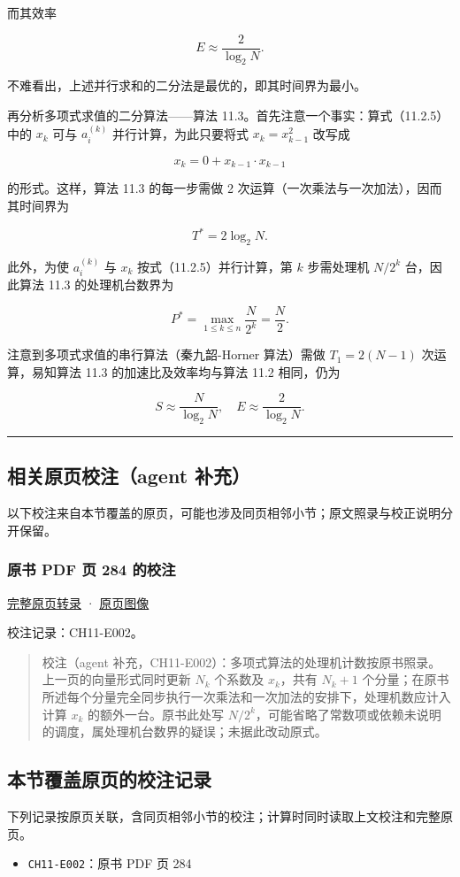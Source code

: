 \documentclass[
  10pt,
  fontset=fandol]{ctexart}
\providecommand{\tightlist}{%
  \setlength{\itemsep}{0pt}\setlength{\parskip}{0pt}}
\begin{document}
而其效率

\[
E\approx\frac{2}{\log_2 N}.
\]

不难看出，上述并行求和的二分法是最优的，即其时间界为最小。

再分析多项式求值的二分算法------算法 11.3。首先注意一个事实：算式（11.2.5）中的 \(x_k\) 可与 \(a_i^{(k)}\) 并行计算，为此只要将式 \(x_k=x_{k-1}^2\) 改写成

\[
x_k=0+x_{k-1}\cdot x_{k-1}
\]

的形式。这样，算法 11.3 的每一步需做 2 次运算（一次乘法与一次加法），因而其时间界为

\[
T^*=2\log_2 N.
\]

此外，为使 \(a_i^{(k)}\) 与 \(x_k\) 按式（11.2.5）并行计算，第 \(k\) 步需处理机 \(N/2^k\) 台，因此算法 11.3 的处理机台数界为

\[
P^*=\max_{1\le k\le n}\frac{N}{2^k}=\frac{N}{2}.
\]

注意到多项式求值的串行算法（秦九韶-Horner 算法）需做 \(T_1=2(N-1)\) 次运算，易知算法 11.3 的加速比及效率均与算法 11.2 相同，仍为

\[
S\approx\frac{N}{\log_2 N},\quad E\approx\frac{2}{\log_2 N}.
\]

\begin{center}\rule{0.5\linewidth}{0.5pt}\end{center}

\subsection{相关原页校注（agent 补充）}\label{ux76f8ux5173ux539fux9875ux6821ux6ce8agent-ux8865ux5145}

以下校注来自本节覆盖的原页，可能也涉及同页相邻小节；原文照录与校正说明分开保留。

\subsubsection{原书 PDF 页 284 的校注}\label{ux539fux4e66-pdf-ux9875-284-ux7684ux6821ux6ce8}

\href{../pages/pdf-284.md}{完整原页转录} · \href{../../source-images/pdf-284.jpeg}{原页图像}

校注记录：CH11-E002。

\begin{quote}
校注（agent 补充，CH11-E002）：多项式算法的处理机计数按原书照录。上一页的向量形式同时更新 \(N_k\) 个系数及 \(x_k\)，共有 \(N_k+1\) 个分量；在原书所述每个分量完全同步执行一次乘法和一次加法的安排下，处理机数应计入计算 \(x_k\) 的额外一台。原书此处写 \(N/2^k\)，可能省略了常数项或依赖未说明的调度，属处理机台数界的疑误；未据此改动原式。
\end{quote}

\subsection{本节覆盖原页的校注记录}\label{ux672cux8282ux8986ux76d6ux539fux9875ux7684ux6821ux6ce8ux8bb0ux5f55}

下列记录按原页关联，含同页相邻小节的校注；计算时同时读取上文校注和完整原页。

\begin{itemize}
\tightlist
\item
  \texttt{CH11-E002}：原书 PDF 页 284
\end{itemize}
\end{document}

